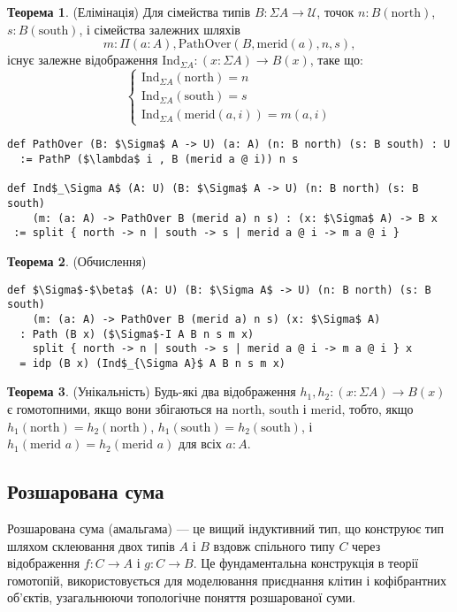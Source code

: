 \documentclass{article}
\theoremstyle{definition}
\newtheorem{theorem}{Теорема}
\begin{document}
\begin{theorem} (Елімінація)
Для сімейства типів \( B : \Sigma A \to \mathcal{U} \), точок \( n : B(\text{north}) \), \( s : B(\text{south}) \), і сімейства
залежних шляхів
\[
  m : \Pi (a : A), \text{PathOver}(B,\text{merid}(a),n,s),
\]
існує залежне відображення \( \text{Ind}_{\Sigma A} : (x : \Sigma A) \to B(x) \), таке що:
\[
\begin{cases}
\text{Ind}_{\Sigma A}(\text{north}) = n \\
\text{Ind}_{\Sigma A}(\text{south}) = s \\
\text{Ind}_{\Sigma A}(\text{merid}(a,i)) = m(a,i)
\end{cases}
\]
\begin{lstlisting}[mathescape=true]
def PathOver (B: $\Sigma$ A -> U) (a: A) (n: B north) (s: B south) : U
  := PathP ($\lambda$ i , B (merid a @ i)) n s

def Ind$_\Sigma A$ (A: U) (B: $\Sigma$ A -> U) (n: B north) (s: B south)
    (m: (a: A) -> PathOver B (merid a) n s) : (x: $\Sigma$ A) -> B x
 := split { north -> n | south -> s | merid a @ i -> m a @ i }
\end{lstlisting}
\end{theorem}

\begin{theorem} (Обчислення)
\begin{lstlisting}[mathescape=true]
def $\Sigma$-$\beta$ (A: U) (B: $\Sigma A$ -> U) (n: B north) (s: B south)
    (m: (a: A) -> PathOver B (merid a) n s) (x: $\Sigma$ A)
  : Path (B x) ($\Sigma$-I A B n s m x)
    split { north -> n | south -> s | merid a @ i -> m a @ i } x
  = idp (B x) (Ind$_{\Sigma A}$ A B n s m x)
\end{lstlisting}
\end{theorem}

\begin{theorem} (Унікальність)
Будь-які два відображення \( h_1, h_2 : (x : \Sigma A) \to B(x) \) є гомотопними, якщо вони збігаються
на \( \text{north} \), \( \text{south} \) і \( \text{merid} \), тобто,
якщо \( h_1(\text{north}) = h_2(\text{north}) \), \( h_1(\text{south}) = h_2(\text{south}) \),
і \( h_1(\text{merid } a) = h_2(\text{merid } a) \) для всіх \( a : A \).
\end{theorem}

\subsection{Розшарована сума}
Розшарована сума (амальгама) — це вищий індуктивний тип, що конструює тип шляхом
склеювання двох типів \( A \) і \( B \) вздовж спільного типу \( C \) через відображення \( f : C \to A \)
і \( g : C \to B \). Це фундаментальна конструкція в теорії гомотопій,
використовується для моделювання приєднання клітин і кофібрантних об’єктів, узагальнюючи
топологічне поняття розшарованої суми.
\end{document}

